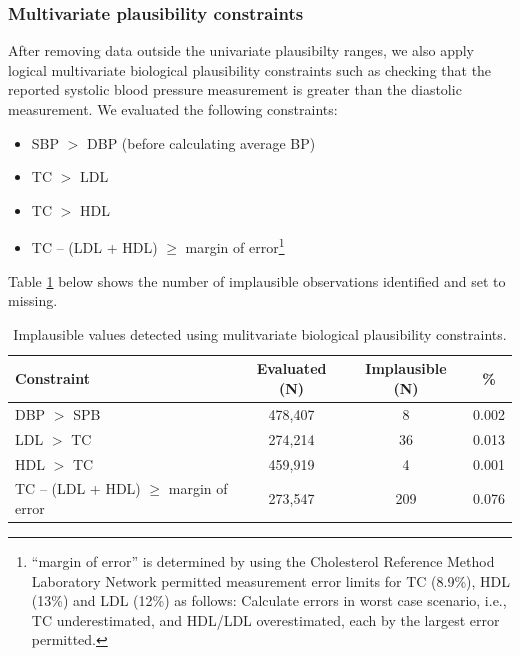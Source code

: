 \documentclass[12pt]{article}
\begin{document}
\begin{appendix}
    \subsubsection{Multivariate plausibility constraints}
    After removing data outside the univariate plausibilty ranges, we also apply logical multivariate biological plausibility constraints such as checking that the reported systolic blood pressure measurement is greater than the diastolic measurement. We evaluated the following constraints:
    \begin{itemize}
        \item SBP $>$ DBP (before calculating average BP) 
        \item TC $>$ LDL 
        \item TC $>$ HDL
        \item TC – (LDL + HDL) $\geq$ margin of error\footnote{“margin of error” is determined by using the Cholesterol Reference Method Laboratory Network permitted measurement error limits for TC (8.9\%), HDL (13\%) and LDL (12\%) as follows: Calculate errors in worst case scenario, i.e., TC underestimated, and HDL/LDL overestimated, each by the largest error permitted.}
    \end{itemize}
    Table \ref{tab:mv_constraints} below shows the number of implausible observations identified and set to missing.
    \begin{table}[H]
        \centering
        \caption{Implausible values detected using mulitvariate biological plausibility constraints.}
        \label{tab:mv_constraints}
        \begin{tabular}{lccc}
            \toprule
            Constraint & Evaluated (N) & Implausible (N) & \% \\
            \midrule
            DBP $>$ SPB & 478,407 & 8 & 0.002\\
            LDL $>$ TC & 274,214 & 36 & 0.013\\
            HDL $>$ TC & 459,919 & 4 & 0.001\\
            TC – (LDL + HDL) $\geq$ margin of error & 273,547 & 209 & 0.076\\
            \bottomrule
            \end{tabular}
    \end{table}


\end{appendix}
\end{document}
